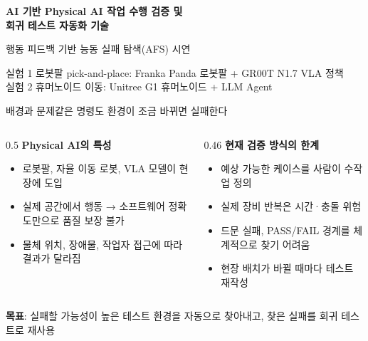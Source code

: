 \documentclass[aspectratio=169,11pt]{beamer}
\begin{document}
{
\begin{frame}
\vspace*{10mm}
{\fontsize{22}{32}\selectfont\bfseries AI 기반 Physical AI 작업 수행 검증 및\\회귀 테스트 자동화 기술\par}
\vspace{6mm}
{\large\color{muted} 행동 피드백 기반 능동 실패 탐색(AFS) 시연\par}
\vspace{14mm}
{\normalsize 실험 1 \; 로봇팔 pick-and-place: Franka Panda 로봇팔 + GR00T N1.7 VLA 정책\\[1mm] 실험 2 \; 휴머노이드 이동: Unitree G1 휴머노이드 + LLM Agent\par}
\end{frame}}

\begin{frame}{배경과 문제}{같은 명령도 환경이 조금 바뀌면 실패한다}
\vspace{4mm}
\begin{columns}[T]
\begin{column}{0.5\textwidth}
\textbf{Physical AI의 특성}
\begin{itemize}
\item 로봇팔, 자율 이동 로봇, VLA 모델이 현장에 도입
\item 실제 공간에서 행동 → 소프트웨어 정확도만으로 품질 보장 불가
\item 물체 위치, 장애물, 작업자 접근에 따라 결과가 달라짐
\end{itemize}
\end{column}
\begin{column}{0.46\textwidth}
\textbf{현재 검증 방식의 한계}
\begin{itemize}
\item 예상 가능한 케이스를 사람이 수작업 정의
\item 실제 장비 반복은 시간·충돌 위험
\item 드문 실패, PASS/FAIL 경계를 체계적으로 찾기 어려움
\item 현장 배치가 바뀔 때마다 테스트 재작성
\end{itemize}
\end{column}
\end{columns}
\vspace{8mm}
\begin{center}
\colorbox{afs!10}{\parbox{0.9\textwidth}{\centering\large
\textbf{목표}: 실패할 가능성이 높은 테스트 환경을 자동으로 찾아내고, 찾은 실패를 회귀 테스트로 재사용}}
\end{center}
\end{frame}
\end{document}
